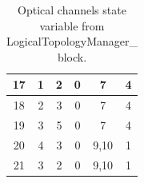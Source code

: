 \begin{table}[H]
\begin{tabular}{|c|c|c|c|c|c|}
		17                  & 1          & 2               & 0                & 7      &4      \\ \hline
		18                  & 2          & 3               & 0                & 7       &4     \\ \hline
		19                  & 3          & 5               & 0                & 7      &4      \\ \hline
		20                  & 4          & 3               & 0                & 9,10    &1     \\ \hline
		21                  & 3          & 2               & 0                & 9,10    &1     \\ \hline
	\end{tabular}
	\caption{Optical channels state variable from LogicalTopologyManager\_  block.}
	\label{opticalChannels_example}
\end{table}

